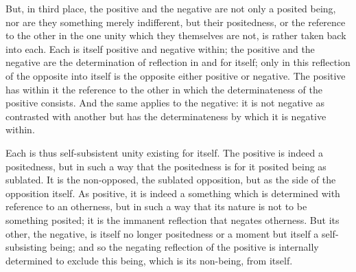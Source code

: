 But, in third place, the positive and the negative are not only a posited
being, nor are they something merely indifferent, but their positedness, or
the reference to the other in the one unity which they themselves are not, is
rather taken back into each. Each is itself positive and negative within; the
positive and the negative are the determination of reflection in and for
itself; only in this reflection of the opposite into itself is the opposite either
positive or negative. The positive has within it the reference to the other in
which the determinateness of the positive consists. And the same applies
to the negative: it is not negative as contrasted with another but has the
determinateness by which it is negative within.

Each is thus self-subsistent unity existing for itself. The positive is indeed
a positedness, but in such a way that the positedness is for it posited being
as sublated. It is the non-opposed, the sublated opposition, but as the side
of the opposition itself.  As positive, it is indeed a something which is
determined with reference to an otherness, but in such a way that its nature
is not to be something posited; it is the immanent reflection that negates
otherness. But its other, the negative, is itself no longer positedness or a
moment but itself a self-subsisting being; and so the negating reflection
of the positive is internally determined to exclude this being, which is its
non-being, from itself.

